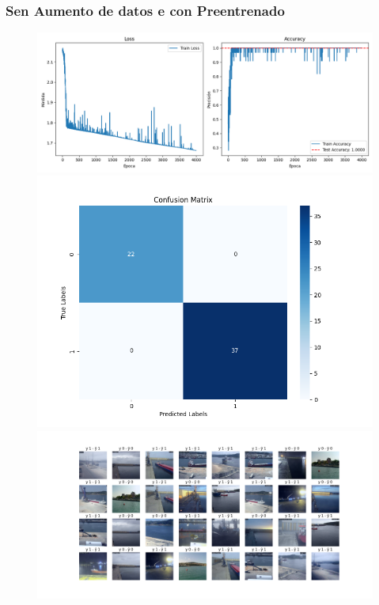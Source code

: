 \documentclass{article}
\begin{document}
\begin{figure}[H]
\begin{minipage}{0.7\textwidth}
    \end{minipage}
\end{figure}
\subsubsection{Sen Aumento de datos e con Preentrenado}
\begin{figure}[H]
    \centering
    \begin{minipage}{0.55\textwidth}
        \centering
        \includegraphics[width=\linewidth]{../figures/LOSS__A_False_P_True_D_False_MLP_True_efficientnet_b4.png}
    \end{minipage}
    \begin{minipage}{0.3\textwidth}
        \centering
        \includegraphics[width=\linewidth]{../figures/CM__A_False_P_True_D_False_MLP_True_efficientnet_b4.png}
    \end{minipage}
    \begin{minipage}{0.7\textwidth}
        \centering
        \includegraphics[width=\linewidth]{../figures/GRID__A_False_P_True_D_False_MLP_True_efficientnet_b4.png}

\end{minipage}
\end{figure}
\end{document}
